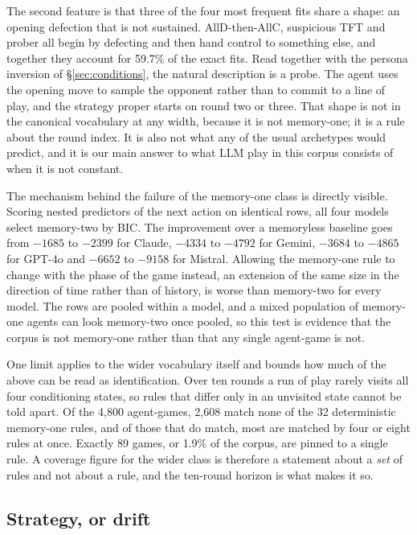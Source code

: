 \documentclass[11pt,a4paper]{article}
\begin{document}
The second feature is that three of the four most frequent fits share a shape:
an opening defection that is not sustained. AllD-then-AllC, suspicious TFT and
prober all begin by defecting and then hand control to something else, and
together they account for 59.7\% of the exact fits. Read together with the
persona inversion of \S\ref{sec:conditions}, the natural description is a
probe. The agent uses the opening move to sample the opponent rather than to
commit to a line of play, and the strategy proper starts on round two or
three. That shape is not in the canonical vocabulary at any width, because it
is not memory-one; it is a rule about the round index. It is also not what any
of the usual archetypes would predict, and it is our main answer to what LLM
play in this corpus consists of when it is not constant.

The mechanism behind the failure of the memory-one class is directly visible.
Scoring nested predictors of the next action on identical rows, all four
models select memory-two by BIC. The improvement over a memoryless baseline
goes from $-1685$ to $-2399$ for Claude, $-4334$ to $-4792$ for Gemini,
$-3684$ to $-4865$ for GPT-4o and $-6652$ to $-9158$ for Mistral. Allowing the
memory-one rule to change with the phase of the game instead, an extension of
the same size in the direction of time rather than of history, is worse than
memory-two for every model. The rows are pooled within a model, and a mixed
population of memory-one agents can look memory-two once pooled, so this test
is evidence that the corpus is not memory-one rather than that any single
agent-game is not.

One limit applies to the wider vocabulary itself and bounds how much of the
above can be read as identification. Over ten rounds a run of play rarely
visits all four conditioning states, so rules that differ only in an unvisited
state cannot be told apart. Of the 4{,}800 agent-games, 2{,}608 match none of
the 32 deterministic memory-one rules, and of those that do match, most are
matched by four or eight rules at once. Exactly 89 games, or 1.9\% of the
corpus, are pinned to a single rule. A coverage figure for the wider class is
therefore a statement about a \emph{set} of rules and not about a rule, and
the ten-round horizon is what makes it so.

\subsection{Strategy, or drift}
\label{sec:verdict}
\end{document}
